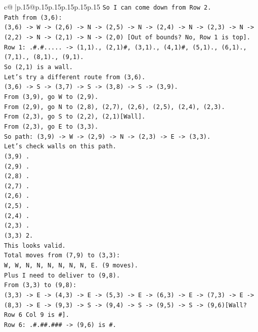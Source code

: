 \documentclass{article}
\begin{document}
{\begin{supertabular}{c@{$\;$}|p{.15\linewidth}@{}p{.15\linewidth}p{.15\linewidth}p{.15\linewidth}p{.15\linewidth}p{.15\linewidth}}
{{{\texttt{So I can come down from Row 2.} \\
\texttt{Path from (3,6):} \\
\texttt{(3,6) {-}> W {-}> (2,6) {-}> N {-}> (2,5) {-}> N {-}> (2,4) {-}> N {-}> (2,3) {-}> N {-}> (2,2) {-}> N {-}> (2,1) {-}> N {-}> (2,0) {[}Out of bounds? No, Row 1 is top{]}.} \\
\texttt{Row 1: .\#.\#..... {-}> (1,1)., (2,1)\#, (3,1)., (4,1)\#, (5,1)., (6,1)., (7,1)., (8,1)., (9,1).} \\
\texttt{So (2,1) is a wall.} \\
\texttt{Let's try a different route from (3,6).} \\
\texttt{(3,6) {-}> S {-}> (3,7) {-}> S {-}> (3,8) {-}> S {-}> (3,9).} \\
\texttt{From (3,9), go W to (2,9).} \\
\texttt{From (2,9), go N to (2,8), (2,7), (2,6), (2,5), (2,4), (2,3).} \\
\texttt{From (2,3), go S to (2,2), (2,1){[}Wall{]}.} \\
\texttt{From (2,3), go E to (3,3).} \\
\texttt{So path: (3,9) {-}> W {-}> (2,9) {-}> N {-}> (2,3) {-}> E {-}> (3,3).} \\
\texttt{Let's check walls on this path.} \\
\texttt{(3,9) .} \\
\texttt{(2,9) .} \\
\texttt{(2,8) .} \\
\texttt{(2,7) .} \\
\texttt{(2,6) .} \\
\texttt{(2,5) .} \\
\texttt{(2,4) .} \\
\texttt{(2,3) .} \\
\texttt{(3,3) 2.} \\
\texttt{This looks valid.} \\
\texttt{Total moves from (7,9) to (3,3):} \\
\texttt{W, W, N, N, N, N, N, N, E. (9 moves).} \\
\texttt{Plus I need to deliver to (9,8).} \\
\texttt{From (3,3) to (9,8):} \\
\texttt{(3,3) {-}> E {-}> (4,3) {-}> E {-}> (5,3) {-}> E {-}> (6,3) {-}> E {-}> (7,3) {-}> E {-}> (8,3) {-}> E {-}> (9,3) {-}> S {-}> (9,4) {-}> S {-}> (9,5) {-}> S {-}> (9,6){[}Wall? Row 6 Col 9 is \#{]}.} \\
\texttt{Row 6: .\#.\#\#.\#\#\# {-}> (9,6) is \#.} \\
}}}
\end{supertabular}}
\end{document}
